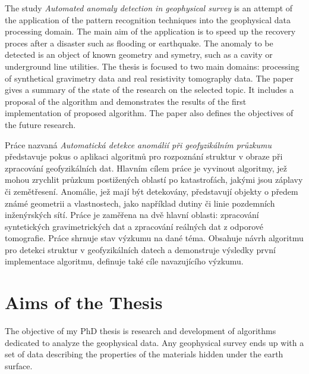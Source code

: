 \documentclass[FM]{tulthesis}
\begin{document}

\renewcommand{\textfraction}{0.05}


\begin{abstractEN}
The study \emph{Automated anomaly detection in geophysical survey} is an attempt of the application of the pattern recognition techniques into the geophysical data processing domain. The main aim of the application is to speed up the recovery proces after a disaster such as flooding or earthquake. The anomaly to be detected is an object of known geometry and symetry, such as a cavity or underground line utilities. The thesis is focused to two main domains: processing of synthetical gravimetry data and real resistivity tomography data. The paper gives a summary of the state of the research on the selected topic. It includes a proposal of the algorithm and demonstrates the results of the first implementation of proposed algorithm. The paper also defines the objectives of the future research. 
\end{abstractEN}


\vspace{2cm}

\begin{abstractCZ}
Práce nazvaná \emph{Automatická detekce anomálií při geofyzikálním průzkumu} představuje pokus o aplikaci algoritmů pro rozpoznání struktur v obraze při zpracování geofyzikálních dat. Hlavním cílem práce je vyvinout algoritmy, jež mohou zrychlit průzkum postižených oblastí po katastrofách, jakými jsou záplavy či zemětřesení. Anomálie, jež mají být detekovány, představují objekty o předem známé geometrii a vlastnostech, jako například dutiny či linie pozdemních inženýrských sítí. Práce je zaměřena na dvě hlavní oblasti: zpracování syntetických gravimetrických dat a zpracování reálných dat z odporové tomografie. Práce shrnuje stav výzkumu na dané téma. Obsahuje návrh algoritmu pro detekci struktur v geofyzikálních datech a demonstruje výsledky první implementace algoritmu, definuje také cíle navazujícího výzkumu. 
\end{abstractCZ}

\listoffigures
\listoftables

\chapter{Aims of the Thesis} \label{chap:aims}
The objective of my PhD thesis is research and development of algorithms dedicated to analyze the geophysical data. Any geophysical survey ends up with a set of data describing the properties of the materials hidden under the earth surface. 
\end{document}
